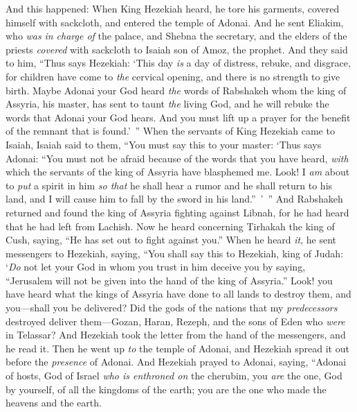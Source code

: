 \begin{biblechapter} %
 And this happened: When King Hezekiah heard, he tore his garments, covered himself with sackcloth, and entered the temple of Adonai.
\verse And he sent Eliakim, who \textit{was} \textit{in charge of} the palace, and Shebna the secretary, and the elders of the priests \textit{covered} with sackcloth to Isaiah son of Amoz, the prophet.
\verse And they said to him, “Thus says Hezekiah: ‘This day \textit{is} a day of distress, rebuke, and disgrace, for children have come to \textit{the} cervical opening, and there is no strength to give birth.
\verse Maybe Adonai your God heard \textit{the} words of Rabshakeh whom the king of Assyria, his master, has sent to taunt \textit{the} living God, and he will rebuke the words that Adonai your God hears. And you must lift up a prayer for the benefit of the remnant that is found.’ ”
\verse When the servants of King Hezekiah came to Isaiah,
\verse Isaiah said to them, “You must say this to your master: ‘Thus says Adonai: “You must not be afraid because of the words that you have heard, \textit{with} which the servants of the king of Assyria have blasphemed me.
\verse Look! I \textit{am} about to \textit{put} a spirit in him \textit{so that} he shall hear a rumor and he shall return to his land, and I will cause him to fall by the sword in his land.” ’ ”
\verse And Rabshakeh returned and found the king of Assyria fighting against Libnah, for he had heard that he had left from Lachish.
\verse Now he heard concerning Tirhakah the king of Cush, saying, “He has set out to fight against you.”
\verse When he heard \textit{it}, he sent messengers to Hezekiah, saying,
\verse “You shall say this to Hezekiah, king of Judah: ‘\textit{Do} not let your God in whom you trust in him deceive you by saying, “Jerusalem will not be given into the hand of the king of Assyria.”
\verse Look! you have heard what the kings of Assyria have done to all lands to destroy them, and you—shall you be delivered?
\verse Did the gods of the nations that my \textit{predecessors} destroyed deliver them—Gozan, Haran, Rezeph, and the sons of Eden who \textit{were} in Telassar?
 And Hezekiah took the letter from the hand of the messengers, and he read it. Then he went up \textit{to} the temple of Adonai, and Hezekiah spread it out before the \textit{presence} of Adonai.
\verse And Hezekiah prayed to Adonai, saying,
\verse “Adonai of hosts, God of Israel \textit{who is enthroned on} the cherubim, you \textit{are} the one, God by yourself, of all the kingdoms of the earth; you are the one who made the heavens and the earth.

\end{biblechapter}
